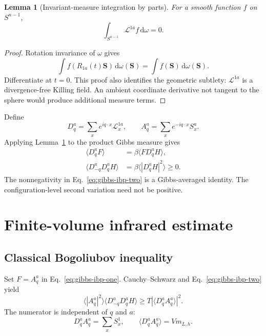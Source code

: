 \documentclass[aps,prb,twocolumn,groupedaddress,amsmath,amssymb,
               superscriptaddress,nofootinbib,floatfix]{revtex4-2}
\theoremstyle{plain}
\newtheorem{lemma}{Lemma}
\theoremstyle{definition}
\newcommand{\dd}{\mathrm{d}}
\begin{document}
\begin{lemma}[Invariant-measure integration by parts]
\label{lem:sphere-ibp}
For a smooth function $f$ on $S^{n-1}$,
\begin{equation}
 \int_{S^{n-1}}\mathcal L^{1a}f\,\dd\omega=0.           \label{eq:sphere-ibp}
\end{equation}
\end{lemma}

\begin{proof}
Rotation invariance of $\omega$ gives
\begin{equation}
 \int f(R_{1a}(t)\bm S)\,\dd\omega(\bm S)
 =
 \int f(\bm S)\,\dd\omega(\bm S).
\end{equation}
Differentiate at $t=0$.  This proof also identifies the geometric
subtlety: $\mathcal L^{1a}$ is a divergence-free Killing field.  An ambient
coordinate derivative not tangent to the sphere would produce additional
measure terms.
\end{proof}

Define
\begin{equation}
 D_q^a=\sum_xe^{iq\cdot x}\mathcal L_x^{1a},\qquad
 A_q^a=\sum_xe^{-iq\cdot x}S_x^a.                      \label{eq:D-A}
\end{equation}
Applying Lemma~\ref{lem:sphere-ibp} to the product Gibbs measure gives
\begin{align}
 \langle D_q^aF\rangle
 &=\beta\langle F D_q^aH\rangle,                       \label{eq:gibbs-ibp-one}\\
 \langle D_{-q}^aD_q^aH\rangle
 &=\beta\langle|D_q^aH|^2\rangle\ge0.                 \label{eq:gibbs-ibp-two}
\end{align}
The nonnegativity in Eq.~\eqref{eq:gibbs-ibp-two} is a Gibbs-averaged
identity.  The configuration-level second variation need not be positive.

\section{Finite-volume infrared estimate}
\label{sec:finite-proof}

\subsection{Classical Bogoliubov inequality}

Set $F=A_q^a$ in Eq.~\eqref{eq:gibbs-ibp-one}.  Cauchy--Schwarz and
Eq.~\eqref{eq:gibbs-ibp-two} yield
\begin{equation}
 \langle|A_q^a|^2\rangle
 \langle D_{-q}^aD_q^aH\rangle
 \ge
 T|\langle D_q^aA_q^a\rangle|^2.                      \label{eq:classical-bog}
\end{equation}
The numerator is independent of $q$ and $a$:
\begin{equation}
 D_q^aA_q^a=\sum_xS_x^1,\qquad
 \langle D_q^aA_q^a\rangle=Vm_{L,h}.                  \label{eq:numerator}
\end{equation}
\end{document}
